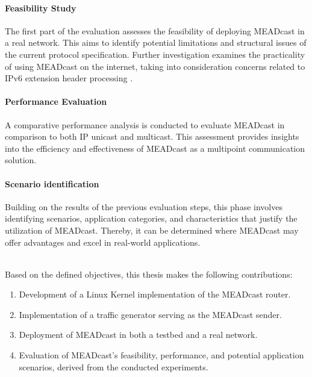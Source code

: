 \paragraph{Feasibility Study} %
\label{par:Feasibility Study}
The first part of the evaluation assesses the feasibility of deploying
    MEADcast in a real network.
This aims to identify potential limitations and structural issues of the
    current protocol specification.
Further investigation examines the practicality of using MEADcast on the
    internet, taking into consideration concerns related to IPv6 extension
    header processing \cite{rfc7872_ext_hdrs_drop_rate}.

\paragraph{Performance Evaluation} %
\label{par:Performance Evaluation}
A comparative performance analysis is conducted to evaluate MEADcast in
    comparison to both IP unicast and multicast.
This assessment provides insights into the efficiency and effectiveness of
    MEADcast as a multipoint communication solution.

\paragraph{Scenario identification} %
\label{par:Scenario identification}
Building on the results of the previous evaluation steps, this phase involves
    identifying scenarios, application categories, and characteristics that
    justify the utilization of MEADcast.
Thereby, it can be determined where MEADcast may offer advantages and excel in
    real-world applications.
    
\noindent\\
Based on the defined objectives, this thesis makes the following contributions:
\begin{enumerate}[itemsep=0.3em]
    \item Development of a Linux Kernel implementation of the MEADcast router.
    \item Implementation of a traffic generator serving as the MEADcast sender.
    \item Deployment of MEADcast in both a testbed and a real network.
    \item Evaluation of MEADcast's feasibility, performance, and potential
            application scenarios, derived from the conducted experiments.
\end{enumerate}

